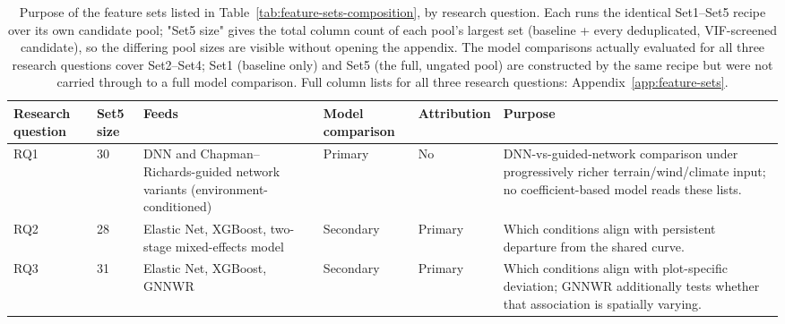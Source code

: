 \documentclass[11pt,a4paper]{report}
\begin{document}
\begin{table}[!htbp]
\centering
\scriptsize
\renewcommand{\arraystretch}{1.2}
\begin{tabular}{p{1.3cm}p{1.3cm}p{3.6cm}p{1.4cm}p{1.6cm}p{3.4cm}}
\toprule
Research question & Set5 size & Feeds & Model comparison & Attribution & Purpose \\
\midrule
RQ1 & 30 & DNN and Chapman--Richards-guided network variants (environment-conditioned) & Primary &
No & DNN-vs-guided-network comparison under progressively richer terrain/wind/climate input; no
coefficient-based model reads these lists. \\
RQ2 & 28 & Elastic Net, XGBoost, two-stage mixed-effects model & Secondary & Primary & Which
conditions align with persistent departure from the shared curve. \\
RQ3 & 31 & Elastic Net, XGBoost, GNNWR & Secondary & Primary & Which conditions align with
plot-specific deviation; GNNWR additionally tests whether that association is spatially
varying. \\
\bottomrule
\end{tabular}
\caption{Purpose of the feature sets listed in Table~\ref{tab:feature-sets-composition}, by
research question. Each runs the identical Set1--Set5 recipe over its own candidate pool; "Set5
size" gives the total column count of each pool's largest set (baseline + every deduplicated,
VIF-screened candidate), so the differing pool sizes are visible without opening the appendix. The
model comparisons actually evaluated for all three research questions cover Set2--Set4; Set1
(baseline only) and Set5 (the full, ungated pool) are constructed by the same recipe but were not
carried through to a full model comparison. Full column lists for all three research questions:
Appendix~\ref{app:feature-sets}.}
\label{tab:feature-set-purpose}
\end{table}
\end{document}
